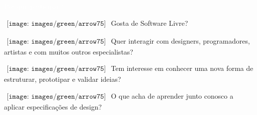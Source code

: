 
\newcommand{\QuestionEntry}[1]{
	$\begin{array}{l}
	{\texttt{[image: images/green/arrow75]}}
	\end{array}
	$ #1
}

\LARGE
\noindent\colorbox{materialRed}
{\parbox[c][25pt][c]{\textwidth}{\hspace{15pt}\textcolor{white}{Por que participar?}}} %

\large
\vspace*{10pt}
\QuestionEntry{Gosta de Software Livre?}

\QuestionEntry{Quer interagir com designers, programadores, artistas e com muitos outros especialistas?}

\QuestionEntry{Tem interesse em conhecer uma nova forma de estruturar, prototipar e validar ideias?}

\QuestionEntry{O que acha de aprender junto conosco a aplicar especificações de design?}


\vspace*{5pt}
